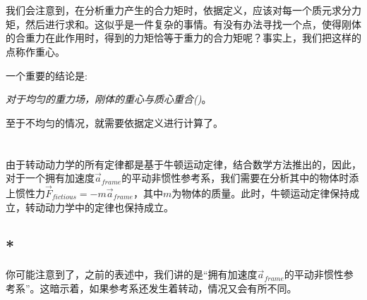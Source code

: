 \section[重心]{}
我们会注意到，在分析重力产生的合力矩时，依据定义，应该对每一个质元求分力矩，然后进行求和。这似乎是一件复杂的事情。有没有办法寻找一个点，使得刚体的合重力在此作用时，得到的力矩恰等于重力的合力矩呢？事实上，我们把这样的点称作重心。

一个重要的结论是:
\begin{center}
	{\itshape 对于均匀的重力场，刚体的重心与质心重合()}。
\end{center}

至于不均匀的情况，就需要依据定义进行计算了。
\section[非惯性系情形]{}
\subsection[非惯性力]{}
由于转动动力学的所有定律都是基于牛顿运动定律，结合数学方法推出的，因此，对于一个拥有加速度$\vec{a}_{frame}$的平动非惯性参考系，我们需要在分析其中的物体时添上惯性力$\vec{F}_{fictious}=-m\vec{a}_{frame}$，其中$m$为物体的质量。此时，牛顿运动定律保持成立，转动动力学中的定律也保持成立。

\subsection[科里奥利力*]{*}
你可能注意到了，之前的表述中，我们讲的是“拥有加速度$\vec{a}_{frame}$的平动非惯性参考系”。这暗示着，如果参考系还发生着转动，情况又会有所不同。

